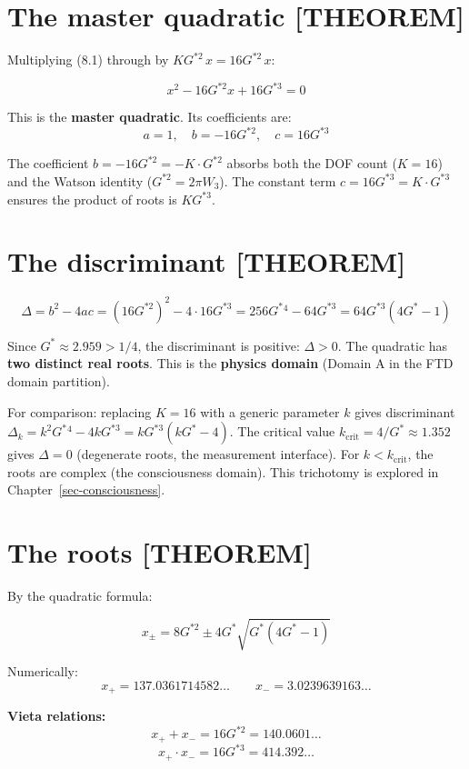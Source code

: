 \documentclass[
  11pt,
  letterpaper,
  twoside,
  openany]{book}
\makeatletter
\let\orig@section\section
\renewcommand{\section}{\needspace{8\baselineskip}\orig@section}
\newcommand{\Gs}{G^{*}{}}
\newcommand{\Gssq}{G^{*2}{}}      %
\newcommand{\Gscu}{G^{*3}{}}      %
\makeatother
\begin{document}
\section{The master quadratic
{[}THEOREM{]}}\label{the-master-quadratic-theorem}

Multiplying (8.1) through by \(K\Gssq\, x = 16\Gssq\, x\):

\[
x^2 - 16\Gssq x + 16\Gscu = 0
\tag{8.2}
\]

This is the \textbf{master quadratic}. Its coefficients are: \[
a = 1, \quad b = -16\Gssq, \quad c = 16\Gscu
\]

The coefficient \(b = -16\Gssq = -K \cdot \Gssq\) absorbs both the DOF
count (\(K = 16\)) and the Watson identity (\(\Gssq = 2\pi W_3\)). The
constant term \(c = 16\Gscu = K \cdot \Gscu\) ensures the product of
roots is \(K \Gscu\).

\section{The discriminant {[}THEOREM{]}}\label{the-discriminant-theorem}

\[
\Delta = b^2 - 4ac = (16\Gssq)^2 - 4 \cdot 16\Gscu = 256\Gs^{\!4} - 64\Gscu = 64\Gscu(4\Gs - 1)
\tag{8.3}
\]

Since \(\Gs \approx 2.959 > 1/4\), the discriminant is positive:
\(\Delta > 0\). The quadratic has \textbf{two distinct real roots}. This
is the \textbf{physics domain} (Domain A in the FTD domain partition).

For comparison: replacing \(K = 16\) with a generic parameter \(k\)
gives discriminant
\(\Delta_k = k^2 \Gs^{\!4} - 4k\Gscu = k\Gscu(k\Gs - 4)\). The critical
value \(k_{\text{crit}} = 4/\Gs \approx 1.352\) gives \(\Delta = 0\)
(degenerate roots, the measurement interface). For
\(k < k_{\text{crit}}\), the roots are complex (the consciousness
domain). This trichotomy is explored in Chapter~\ref{sec-consciousness}.

\section{The roots {[}THEOREM{]}}\label{the-roots-theorem}

By the quadratic formula:

\[
x_\pm = 8\Gssq \pm 4\Gs \sqrt{\Gs(4\Gs - 1)}
\tag{8.4}
\]

Numerically: \[
x_+ = 137.0361714582\ldots \qquad x_- = 3.0239639163\ldots
\]

\textbf{Vieta relations:} \[
x_+ + x_- = 16\Gssq = 140.0601\ldots
\tag{8.5}
\] \[
x_+ \cdot x_- = 16\Gscu = 414.392\ldots
\tag{8.6}
\]
\end{document}
